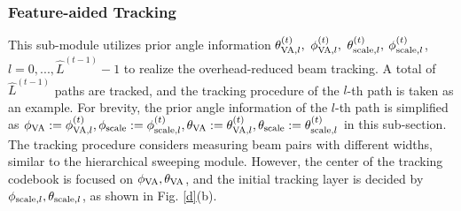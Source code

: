 \documentclass[journal,12pt,onecolumn,draftclsnofoot,]{IEEEtran}
\begin{document}
\subsubsection{Feature-aided Tracking}
This sub-module utilizes prior angle information $\theta _{{\rm{VA}},l}^{(t )},$ $\phi _{{\rm{VA}},l}^{(t )},$ $\theta _{{\rm{scale}},l}^{(t )},$ $\phi _{{\rm{scale}},l}^{(t)}$,
$l = 0, ...,{\hat L}^{({t - 1} )} - 1$ to realize the overhead-reduced beam tracking. 
A total of ${\hat L}^{({t - 1} )}$ paths are tracked, and the tracking procedure of the $l$-th path is taken as an example. 
For brevity, the prior angle information of the $l$-th path is simplified as ${\phi_{\rm VA}}:=\phi _{{\rm{VA}},l}^{(t )} , {\phi _{{\rm{scale}}}}:= \phi _{{\rm{scale}},l}^{(t )},{\theta_{\rm VA}} := \theta _{{\rm{VA}},l}^{(t)}, {\theta _{{\rm{scale}}}}:=\theta _{{\rm{scale}},l}^{(t )}$ in this sub-section. 
The tracking procedure considers measuring beam pairs with different widths, similar to the hierarchical sweeping module. 
However, the center of the tracking codebook is focused on ${\phi_{\rm VA}},{\theta_{\rm VA}}$, and the initial tracking layer is decided by $\phi _{{\rm{scale}},l},\theta _{{\rm{scale}},l}$, as shown in Fig. \ref{d}(b).

{}
{}
\end{document}
